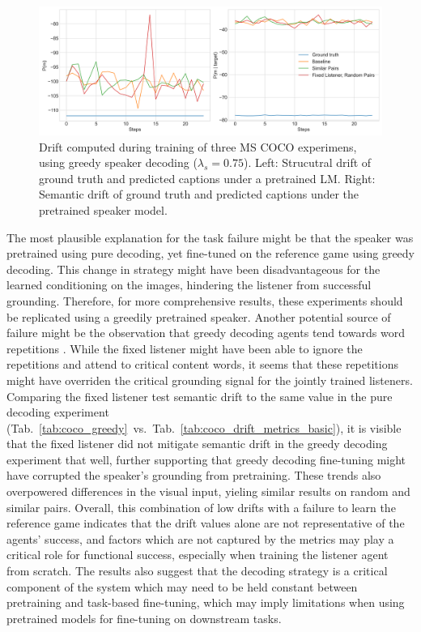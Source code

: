 \begin{figure}
	\centering
	\includegraphics[width=\linewidth]{images/coco_structural_semantic_drift_greedy_all_4000_pure_075.png}
	\caption{Drift computed during training of three MS COCO experimens, using greedy speaker decoding ($\lambda_s = 0.75$). Left: Strucutral drift of ground truth and predicted captions under a pretrained LM. Right: Semantic drift of ground truth and predicted captions under the pretrained speaker model.}
	\label{fig:coco_greedy_drifts}
\end{figure} 

The most plausible explanation for the task failure might be that the speaker was pretrained using pure decoding, yet fine-tuned on the reference game using greedy decoding. This change in strategy might have been disadvantageous for the learned conditioning on the images, hindering the listener from successful grounding. Therefore, for more comprehensive results, these experiments should be replicated using a greedily pretrained speaker. Another potential source of failure might be the observation that greedy decoding agents tend towards word repetitions \parencite[cf.][]{lee2019countering}. While the fixed listener might have been able to ignore the repetitions and attend to critical content words, it seems that these repetitions might have overriden the critical grounding signal for the jointly trained listeners. Comparing the fixed listener test semantic drift to the same value in the pure decoding experiment (Tab.~\ref{tab:coco_greedy}~vs.~Tab.~\ref{tab:coco_drift_metrics_basic}), it is visible that the fixed listener did not mitigate semantic drift in the greedy decoding experiment that well, further supporting that greedy decoding fine-tuning might have corrupted the speaker's grounding from pretraining. 
These trends also overpowered differences in the visual input, yieling similar results on random and similar pairs.
Overall, this combination of low drifts with a failure to learn the reference game indicates that the drift values alone are not representative of the agents' success, and factors which are not captured by the metrics may play a critical role for functional success, especially when training the listener agent from scratch. The results also suggest that the decoding strategy is a critical component of the system which may need to be held constant between pretraining and task-based fine-tuning, which may imply limitations when using pretrained models for fine-tuning on downstream tasks.

